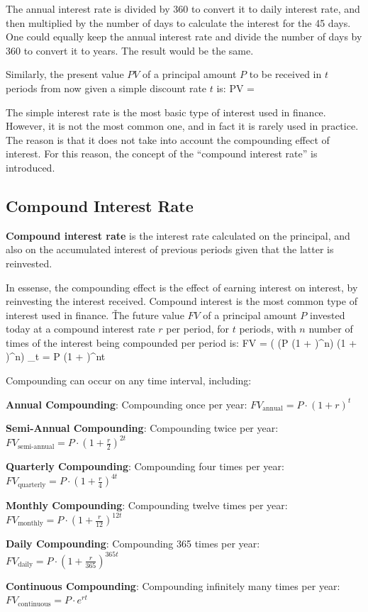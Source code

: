 The annual interest rate is divided by 360 to convert it to daily interest rate, and then multiplied by the number of
days to calculate the interest for the 45 days. One could equally keep the annual interest rate and divide the number
of days by 360 to convert it to years. The result would be the same.
\ee

Similarly, the present value $PV$ of a principal amount $P$ to be received in $t$ periods from now given a simple
discount rate $t$ is:
\bse
PV = 
\ese

The simple interest rate is the most basic type of interest used in finance. However, it is not the most common one,
and in fact it is rarely used in practice. The reason is that it does not take into account the compounding effect
of interest. For this reason, the concept of the ``compound interest rate'' is introduced.

\subsection{Compound Interest Rate}

\textbf{Compound interest rate} is the interest rate calculated on the principal, and also on the accumulated interest
of previous periods given that the latter is reinvested.
\ed

In essense, the compounding effect is the effect of earning interest on interest, by reinvesting the interest
received. Compound interest is the most common type of interest used in finance. \v

The future value $FV$ of a principal amount $P$ invested today at a compound interest rate $r$ per period, for $t$
periods, with $n$ number of times of the interest being compounded per period is:
\bse
FV = \biggl( \Bigl(P \cdot (1 + )^n\Bigr) \cdot (1 + )^n\biggr) \cdot
\underbrace{\ldots}_{t} = P \cdot (1 + )^{nt}
\ese

Compounding can occur on any time interval, including:
\bit
\item \textbf{Annual Compounding}: Compounding once per year: $FV_{\text{annual}} = P \cdot \left(1 + r\right)^{t}$
\item \textbf{Semi-Annual Compounding}: Compounding twice per year: $FV_{\text{semi-annual}} = P \cdot \left(1 +
\frac{r}{2}\right)^{2t}$
\item \textbf{Quarterly Compounding}: Compounding four times per year: $FV_{\text{quarterly}} = P \cdot \left(1 +
\frac{r}{4}\right)^{4t}$
\item \textbf{Monthly Compounding}: Compounding twelve times per year: $FV_{\text{monthly}} = P \cdot \left(1 +
\frac{r}{12}\right)^{12t}$
\item \textbf{Daily Compounding}: Compounding 365 times per year: $FV_{\text{daily}} = P \cdot \left(1 +
\frac{r}{365}\right)^{365t}$
\item \textbf{Continuous Compounding}: Compounding infinitely many times per year: $FV_{\text{continuous}} = P \cdot
e^{rt}$
\eit

